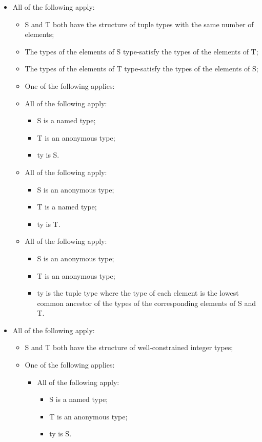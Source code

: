 \documentclass{book}
\begin{document}
\begin{itemize}
  \item  All of the following apply:
    \begin{itemize}
    \item  S and T both have the structure of tuple types with the same number of elements;
    \item  The types of the elements of S type-satisfy the types of the elements of T;
    \item  The types of the elements of T type-satisfy the types of the elements of S;
    \item  One of the following applies:

      \item  All of the following apply:
        \begin{itemize}
        \item  S is a named type;
        \item  T is an anonymous type;
        \item  ty is S.
        \end{itemize}

      \item  All of the following apply:
        \begin{itemize}
        \item  S is an anonymous type;
        \item  T is a named type;
        \item  ty is T.
        \end{itemize}

     \item  All of the following apply:
        \begin{itemize}
        \item  S is an anonymous type;
        \item  T is an anonymous type;
	\item  ty is the tuple type where the type of each element is the lowest common
	  ancestor of the types of the corresponding elements of S and T. 
        \end{itemize}
    \end{itemize}

  \item  All of the following apply:
    \begin{itemize}
    \item  S and T both have the structure of well-constrained integer types;
    \item  One of the following applies:
      \begin{itemize}
      \item  All of the following apply:
        \begin{itemize}
        \item  S is a named type;
        \item  T is an anonymous type;
        \item  ty is S.
        \end{itemize}


\end{itemize}
\end{itemize}
\end{itemize}
\end{document}
